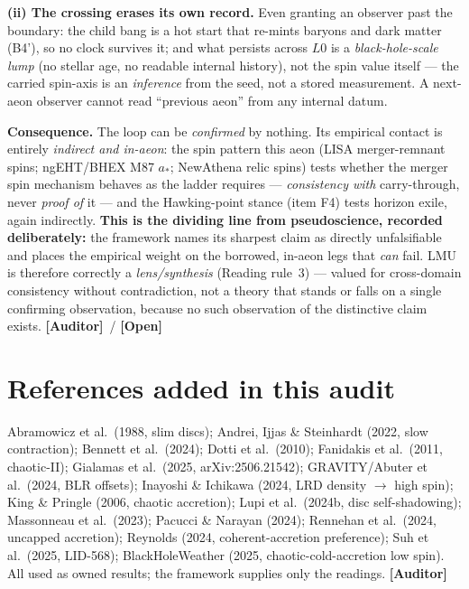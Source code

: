 \documentclass[11pt]{article}
\newcommand{\Open}{\textbf{\textcolor{gray!10!black}{[Open]}}}
\newcommand{\Auditor}{\textbf{\textcolor{teal!55!black}{[Auditor]}}}
\begin{document}
\textbf{(ii) The crossing erases its own record.} Even granting an observer past the boundary: the child bang is a hot start that re-mints baryons and dark matter (B4'), so no clock survives it; and what persists across $L0$ is a \emph{black-hole-scale lump} (no stellar age, no readable internal history), not the spin value itself --- the carried spin-axis is an \emph{inference} from the seed, not a stored measurement. A next-aeon observer cannot read ``previous aeon'' from any internal datum.

\textbf{Consequence.} The loop can be \emph{confirmed} by nothing. Its empirical contact is entirely \emph{indirect and in-aeon}: the spin pattern this aeon (LISA merger-remnant spins; ngEHT/BHEX M87 $a_\ast$; NewAthena relic spins) tests whether the merger spin mechanism behaves as the ladder requires --- \emph{consistency with} carry-through, never \emph{proof of} it --- and the Hawking-point stance (item F4) tests horizon exile, again indirectly. \textbf{This is the dividing line from pseudoscience, recorded deliberately:} the framework names its sharpest claim as directly unfalsifiable and places the empirical weight on the borrowed, in-aeon legs that \emph{can} fail. LMU is therefore correctly a \emph{lens/synthesis} (Reading rule~3) --- valued for cross-domain consistency without contradiction, not a theory that stands or falls on a single confirming observation, because no such observation of the distinctive claim exists. \Auditor\ / \Open

\section*{References added in this audit}
\small
Abramowicz et al.\ (1988, slim discs); Andrei, Ijjas \& Steinhardt (2022, slow contraction); Bennett et al.\ (2024); Dotti et al.\ (2010); Fanidakis et al.\ (2011, chaotic-II); Gialamas et al.\ (2025, arXiv:2506.21542); GRAVITY/Abuter et al.\ (2024, BLR offsets); Inayoshi \& Ichikawa (2024, LRD density $\to$ high spin); King \& Pringle (2006, chaotic accretion); Lupi et al.\ (2024b, disc self-shadowing); Massonneau et al.\ (2023); Pacucci \& Narayan (2024); Rennehan et al.\ (2024, uncapped accretion); Reynolds (2024, coherent-accretion preference); Suh et al.\ (2025, LID-568); BlackHoleWeather (2025, chaotic-cold-accretion low spin). All used as owned results; the framework supplies only the readings. \Auditor
\normalsize
\end{document}
